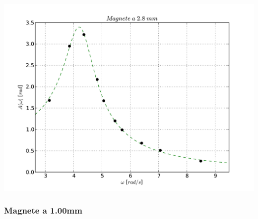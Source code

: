 \begin{center}
\includegraphics[scale=0.75]{"../grafici/Magnetea28mm"}

\end{center}


\subsubsection{Magnete a 1.00mm}

